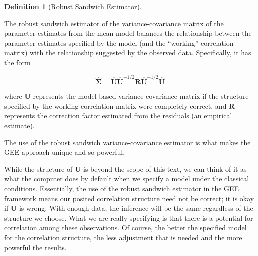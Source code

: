 \documentclass[
  letterpaper,
  DIV=11,
  numbers=noendperiod]{scrreprt}
\theoremstyle{definition}
\newtheorem{definition}{Definition}[chapter]
\theoremstyle{definition}
\theoremstyle{remark}
\begin{document}
\begin{definition}[Robust Sandwich
Estimator]\protect\hypertarget{def-robust-sandwich-estimator}{}\label{def-robust-sandwich-estimator}

The robust sandwich estimator of the variance-covariance matrix of the
parameter estimates from the mean model balances the relationship
between the parameter estimates specified by the model (and the
``working'' correlation matrix) with the relationship suggested by the
observed data. Specifically, it has the form

\[\widehat{\boldsymbol{\Sigma}} = \widehat{\mathbf{U}} \widehat{\mathbf{U}}^{-1/2} \mathbf{R} \widehat{\mathbf{U}}^{-1/2} \widehat{\mathbf{U}}\]

where \(\mathbf{U}\) represents the model-based variance-covariance
matrix if the structure specified by the working correlation matrix were
completely correct, and \(\mathbf{R}\) represents the correction factor
estimated from the residuals (an empirical estimate).

\end{definition}

\begin{tcolorbox}[enhanced jigsaw, left=2mm, toprule=.15mm, arc=.35mm, breakable, opacitybacktitle=0.6, opacityback=0, rightrule=.15mm, colbacktitle=quarto-callout-tip-color!10!white, coltitle=black, leftrule=.75mm, toptitle=1mm, colframe=quarto-callout-tip-color-frame, titlerule=0mm, title=\textcolor{quarto-callout-tip-color}{\faLightbulb}\hspace{0.5em}{Big Idea}, bottomrule=.15mm, colback=white, bottomtitle=1mm]

The use of the robust sandwich variance-covariance estimator is what
makes the GEE approach unique and so powerful.

\end{tcolorbox}

While the structure of \(\mathbf{U}\) is beyond the scope of this text,
we can think of it as what the computer does by default when we specify
a model under the classical conditions. Essentially, the use of the
robust sandwich estimator in the GEE framework means our posited
correlation structure need not be correct; it is okay if \(\mathbf{U}\)
is wrong. With enough data, the inference will be the same regardless of
the structure we choose. What we are really specifying is that there is
a potential for correlation among these observations. Of course, the
better the specified model for the correlation structure, the less
adjustment that is needed and the more powerful the results.
\end{document}
